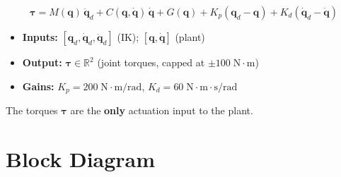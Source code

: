 \documentclass[11pt, a4paper]{article}
\begin{document}
\[
\boxed{
\bm{\tau} = M(\bm{q})\,\ddot{\bm{q}}_d
          + C(\bm{q}, \dot{\bm{q}})\,\dot{\bm{q}}
          + G(\bm{q})
          + K_p (\bm{q}_d - \bm{q})
          + K_d (\dot{\bm{q}}_d - \dot{\bm{q}})
}
\]

\begin{itemize}
  \item \textbf{Inputs:} $[\bm{q}_d, \dot{\bm{q}}_d, \ddot{\bm{q}}_d]$ (IK);
        $[\bm{q}, \dot{\bm{q}}]$ (plant)
  \item \textbf{Output:} $\bm{\tau} \in \mathbb{R}^2$ (joint torques, capped at
        $\pm 100\;\mathrm{N\cdot m}$)
  \item \textbf{Gains:} $K_p = 200\;\mathrm{N\cdot m/rad}$,
        $K_d = 60\;\mathrm{N\cdot m\cdot s/rad}$
\end{itemize}

The torques $\bm{\tau}$ are the \textbf{only} actuation input to the plant.

\section{Block Diagram}
\end{document}
